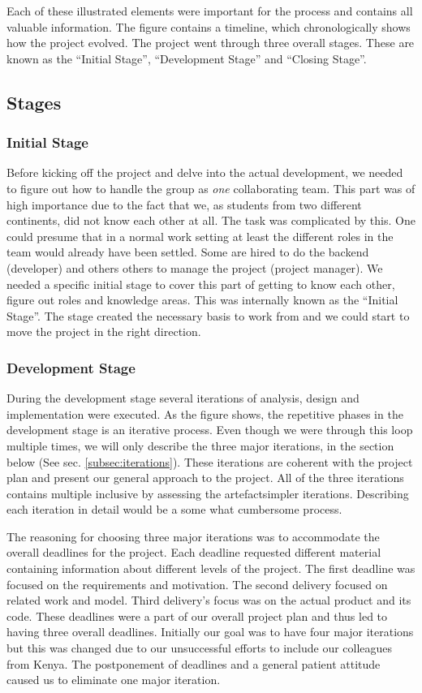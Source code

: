 Each of these illustrated elements were important for the process and contains all valuable information. The figure contains a timeline, which chronologically shows how the project evolved. The project went through three overall stages. These are known as the ``Initial Stage'', ``Development Stage'' and ``Closing Stage''.

\subsection{Stages} \label{subsec:stages}

\subsubsection{Initial Stage}
Before kicking off the project and delve into the actual development, we needed to figure out how to handle the group as \textit{one} collaborating team. This part was of high importance due to the fact that we, as students from two different continents, did not know each other at all. The task was complicated by this. One could presume that in a normal work setting at least the different roles in the team would already have been settled. Some are hired to do the backend (developer) and others others to manage the project (project manager). We needed a specific initial stage to cover this part of getting to know each other, figure out roles and knowledge areas. This was internally known as the ``Initial Stage''. The stage created the necessary basis to work from and we could start to move the project in the right direction.

\subsubsection{Development Stage}
During the development stage several iterations of analysis, design and implementation were executed. As the figure shows, the repetitive phases in the development stage is an iterative process. Even though we were through this loop multiple times, we will only describe the three major iterations, in the section below (See sec. \ref{subsec:iterations}). These iterations are coherent with the project plan and present our general approach to the project. All of the three iterations contains multiple inclusive \textemdash by assessing the artefact\textemdash simpler iterations. Describing each iteration in detail would be a some what cumbersome process.

The reasoning for choosing three major iterations was to accommodate the overall deadlines for the project. Each deadline requested different material containing information about different levels of the project. The first deadline was focused on the requirements and motivation. The second delivery focused on related work and model. Third delivery's focus was on the actual product and its code. These deadlines were a part of our overall project plan and thus led to having three overall deadlines. Initially our goal was to have four major iterations but this was changed due to our unsuccessful efforts to include our colleagues from Kenya. The postponement of deadlines and a general patient attitude caused us to eliminate one major iteration. 

